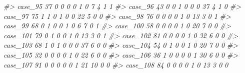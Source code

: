 \documentclass[]{book}
\newenvironment{Shaded}{\begin{snugshade}}{\end{snugshade}}
\newcommand{\CommentTok}[1]{\textcolor[rgb]{0.56,0.35,0.01}{\textit{#1}}}
\begin{document}
\begin{Shaded}
\begin{Highlighting}[]
\CommentTok{#> case_95   37        0        0                0                 0                 1              0                     7                      4           1             1}
\CommentTok{#> case_96   43        0        0                1                 0                 0              0                    37                      4           1             0}
\CommentTok{#> case_97   75        1        1                0                 1                 0              0                    22                      5           0             0}
\CommentTok{#> case_98   76        0        0                0                 0                 1              0                    13                      3           0             1}
\CommentTok{#> case_99   68        0        1                0                 0                 1              0                     6                      7           0             1}
\CommentTok{#> case_100  58        0        0                0                 0                 1              0                    20                      7           0             0}
\CommentTok{#> case_101  79        0        1                0                 0                 1              0                    13                      3           0             1}
\CommentTok{#> case_102  81        0        0                0                 0                 1              0                    32                      6           0             0}
\CommentTok{#> case_103  68        1        0                1                 0                 0              0                    37                      6           0             0}
\CommentTok{#> case_104  54        0        1                0                 0                 1              0                    20                      7           0             0}
\CommentTok{#> case_105  32        0        0                0                 0                 1              0                    22                      6           0             0}
\CommentTok{#> case_106  36        1        0                0                 0                 0              1                    30                      6           0             0}
\CommentTok{#> case_107  91        0        0                0                 0                 0              1                    21                     10           0             0}
\CommentTok{#> case_108  84        0        0                0                 0                 1              0                    13                      3           0             0}

\end{Highlighting}
\end{Shaded}
\end{document}
